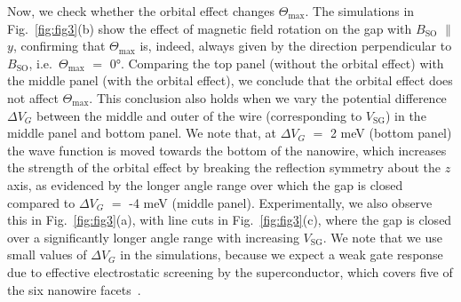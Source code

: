 Now, we check whether the orbital effect changes $\Theta_{\mathrm{max}}$.
The simulations in Fig.~\ref{fig:fig3}(b) show the effect of magnetic field rotation on the gap with $B_{\mathrm{SO}}$ $\parallel$ $y$, confirming that $\Theta_{\mathrm{max}}$ is, indeed, always given by the direction perpendicular to $B_{\mathrm{SO}}$, i.e.~$\Theta_{\mathrm{max}}$ $=$ \ang{0}.
Comparing the top panel (without the orbital effect) with the middle panel (with the orbital effect), we conclude that the orbital effect does not affect $\Theta_{\mathrm{max}}$.
This conclusion also holds when we vary the potential difference $\Delta V_G$ between the middle and outer of the wire (corresponding to $V_{\mathrm{SG}}$) in the middle panel and bottom panel.
We note that, at $\Delta V_G$ $=$ 2 meV (bottom panel) the wave function is moved towards the bottom of the nanowire, which increases the strength of the orbital effect by breaking the reflection symmetry about the $z$ axis, as evidenced by the longer angle range over which the gap is closed compared to $\Delta V_G$ $=$ -4 meV (middle panel).
Experimentally, we also observe this in Fig.~\ref{fig:fig3}(a), with line cuts in Fig.~\ref{fig:fig3}(c), where the gap is closed over a significantly longer angle range with increasing $V_{\mathrm{SG}}$.
We note that we use small values of $\Delta V_G$ in the simulations, because we expect a weak gate response due to effective electrostatic screening by the superconductor, which covers five of the six nanowire facets~\cite{Zhang2017}.

